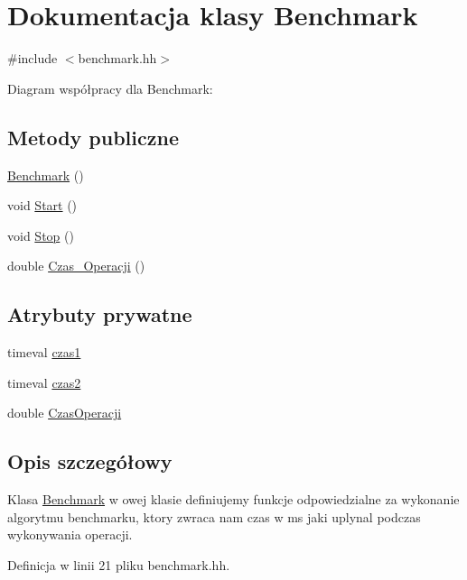 \hypertarget{class_benchmark}{\section{\-Dokumentacja klasy \-Benchmark}
\label{class_benchmark}
}


{\ttfamily \#include $<$benchmark.\-hh$>$}



\-Diagram współpracy dla \-Benchmark\-:
\subsection*{\-Metody publiczne}
\begin{DoxyCompactItemize}
\item 
\hyperlink{class_benchmark_acfca497989836a688d44477802e822d8}{\-Benchmark} ()
\item 
void \hyperlink{class_benchmark_ac55ca7809108ed22a644d6d41071d187}{\-Start} ()
\item 
void \hyperlink{class_benchmark_aa3ca94f8984beb0ecbfa77d50cbe5c3a}{\-Stop} ()
\item 
double \hyperlink{class_benchmark_aee4890492aa777816da1d63fa7a8c4c2}{\-Czas\-\_\-\-Operacji} ()
\end{DoxyCompactItemize}
\subsection*{\-Atrybuty prywatne}
\begin{DoxyCompactItemize}
\item 
timeval \hyperlink{class_benchmark_a461847eb9a01e511e19af6cd7bcc057e}{czas1}
\item 
timeval \hyperlink{class_benchmark_a56ec92a30b650825403d14907a321eea}{czas2}
\item 
double \hyperlink{class_benchmark_accd4af9649210ce216db513c0676c401}{\-Czas\-Operacji}
\end{DoxyCompactItemize}


\subsection{\-Opis szczegółowy}
\-Klasa \hyperlink{class_benchmark}{\-Benchmark} w owej klasie definiujemy funkcje odpowiedzialne za wykonanie algorytmu benchmarku, ktory zwraca nam czas w ms jaki uplynal podczas wykonywania operacji. 

\-Definicja w linii 21 pliku benchmark.\-hh.



